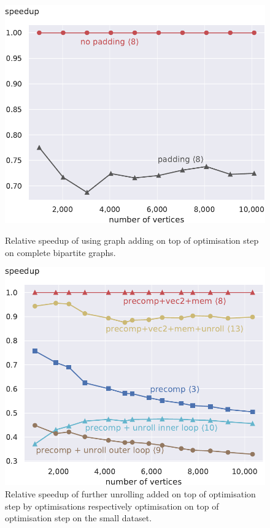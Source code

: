 \documentclass[final,letterpaper]{article}
\begin{document}
\begin{figure}[!t]
\begin{minipage}[t]{\oldlinewidth}\centering
	\includegraphics[width=\linewidth]{img/speedup[8]padding_bipartite.pdf}
	\caption{Relative speedup of using graph adding on top of optimisation step  on complete bipartite graphs. \label{speedupGraphPaddingBipartite}}
\end{minipage}%
\hspace{7.2mm}
\begin{minipage}[t]{\oldlinewidth}\centering
	\includegraphics[width=\linewidth]{img/speedup[3][8][9][10][13]_small.pdf}
	\caption{Relative speedup of further unrolling added on top of optimisation step  by optimisations  respectively optimisation  on top of optimisation step  on the small dataset. \label{speedupUnsuccessful}}
\end{minipage}%
\end{figure}
\end{document}
